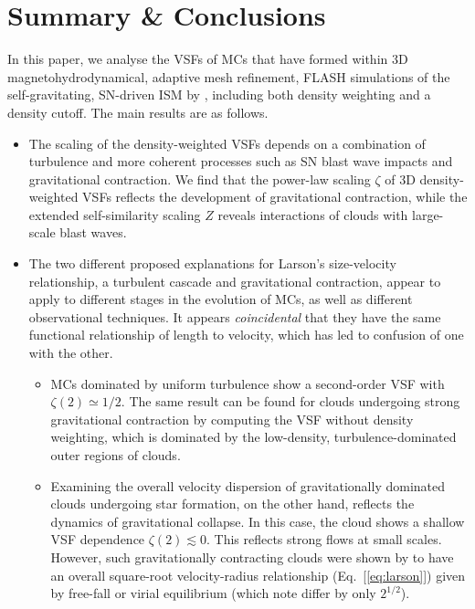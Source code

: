 \section{Summary \& Conclusions}\label{conclusions}

In this paper, we analyse the VSFs of MCs that have formed within 3D magnetohydrodynamical, adaptive mesh refinement, FLASH simulations of the self-gravitating, SN-driven ISM by , including both density weighting and a density cutoff.
The main results are as follows.

\begin{itemize}
	\item The scaling of the density-weighted VSFs depends on a combination of turbulence and more coherent processes such as SN blast wave impacts and gravitational contraction.
    We find that the power-law scaling $\zeta$ of 3D density-weighted VSFs reflects the development of gravitational contraction, while the extended self-similarity scaling $Z$ reveals interactions of clouds with large-scale blast waves.
    \item The two different proposed explanations for Larson's size-velocity relationship, a turbulent cascade and gravitational contraction,  appear to apply to different stages in the evolution of MCs, as well as different observational techniques. It appears {\em coincidental} that they have the same functional relationship of length to velocity, which has led to confusion of one with the other.
    \begin{itemize}
        \item MCs dominated by uniform turbulence show a second-order VSF with $\zeta(2) \simeq 1/2$.  The same result can be found for clouds undergoing strong gravitational contraction by computing the VSF without density weighting, which is dominated by the low-density, turbulence-dominated outer regions of clouds.
    \item Examining the overall velocity dispersion of gravitationally dominated clouds undergoing star formation, on the other hand, reflects the dynamics of gravitational collapse.  In this case, the cloud shows a shallow VSF dependence $\zeta(2) \lesssim 0$. This reflects strong flows at small scales. However, such gravitationally contracting clouds were shown by  to have an overall square-root velocity-radius relationship (Eq.~[\ref{eq:larson}]) given by free-fall or virial equilibrium (which \citealt{Ballesteros2011} note differ by only $2^{1/2}$).
    \end{itemize}

\end{itemize}
